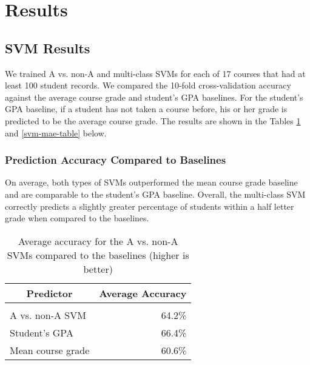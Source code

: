 
\section{Results}

\subsection{SVM Results}

We trained A vs. non-A and multi-class SVMs for each of 17 courses that had at least 100 student records. We compared the 10-fold cross-validation accuracy against the average course grade and student's GPA baselines. For the student's GPA baseline, if a student has not taken a course before, his or her grade is predicted to be the average course grade. The results are shown in the Tables \ref{svm-accuracy-table} and \ref{svm-mae-table} below.

\subsubsection{Prediction Accuracy Compared to Baselines}

On average, both types of SVMs outperformed the mean course grade baseline and are comparable to the student's GPA baseline. Overall, the multi-class SVM correctly predicts a slightly greater percentage of students within a half letter grade when compared to the baselines.

\begin{table}[htbp]\scriptsize
\label{svm-accuracy-table}
\begin{center}
\begin{tabular}{lr}
\multicolumn{1}{c}{\bf Predictor}  &\multicolumn{1}{c}{\bf Average Accuracy}
\\ \hline \\
A vs. non-A SVM &64.2\% \\
Student's GPA   &66.4\% \\
Mean course grade &60.6\% \\
\end{tabular}
\caption{Average accuracy for the A vs. non-A SVMs compared to the baselines (higher is better)}
\end{center}
\end{table}


